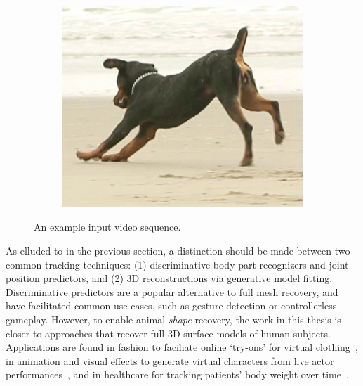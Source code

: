 \begin{figure}[t]
\begin{subfigure}{0.33\textwidth}
    \centering
        \includegraphics[width=1\linewidth]{input/208}
    \end{subfigure}%
    \caption{An example input video sequence.}
    \label{fig:arap_input}
\end{figure}

    

As elluded to in the previous section, a distinction should be made between two common tracking techniques: (1) discriminative body part recognizers and joint position predictors, and (2) 3D reconstructions via generative model fitting. Discriminative predictors are a popular alternative to full mesh recovery, and have facilitated common use-cases, such as gesture detection or controllerless gameplay. However, to enable animal \emph{shape} recovery, the work in this thesis is closer to approaches that recover full 3D surface models of human subjects. Applications are found in fashion to faciliate online `try-ons' for virtual clothing~\cite{lin2014digital}, in animation and visual effects to generate virtual characters from live actor performances~\cite{laine2017production}, and in healthcare for tracking patients' body weight over time~\cite{velardo2010weight}. 


